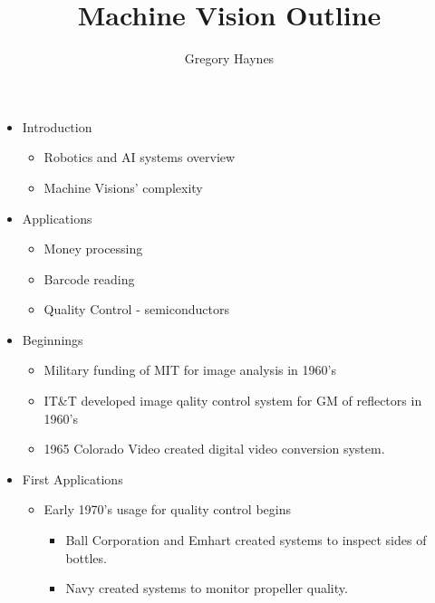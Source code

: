 \documentclass[a4paper,10pt]{article}
\title{Machine Vision Outline}
\author{Gregory Haynes}
\begin{document}
\maketitle

\begin{itemize}

 \item Introduction
 \begin{itemize}
  \item Robotics and AI systems overview
  \item Machine Visions' complexity
 \end{itemize}

 \item Applications
 \begin{itemize}
  \item Money processing
  \item Barcode reading
  \item Quality Control - semiconductors
 \end{itemize}

 \item Beginnings
 \begin{itemize}
  \item Military funding of MIT for image analysis in 1960's
  \item IT\&T developed image qality control system for GM of reflectors in 1960's
  \item 1965 Colorado Video created digital video conversion system.
 \end{itemize}

 \item First Applications
 \begin{itemize}
  \item Early 1970's usage for quality control begins
  \begin{itemize}
   \item Ball Corporation and Emhart created systems to inspect sides of bottles.
   \item Navy created systems to monitor propeller quality.
  \end{itemize}
 \end{itemize}

\end{itemize}
\end{document}
